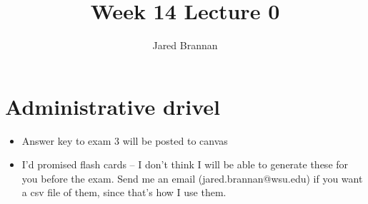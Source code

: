 \documentclass{article}
\title{Week 14 Lecture 0}
\author{Jared Brannan }
\theoremstyle{definition}
\begin{document}
\maketitle

\section{Administrative drivel}
\begin{itemize}
	\item Answer key to exam 3 will be posted to canvas
	\item I'd promised flash cards -- I don't think I will be able to generate these for you before the exam. Send me an email (jared.brannan@wsu.edu) if you want a csv file of them, since that's how I use them. 
\end{itemize}
\end{document}
